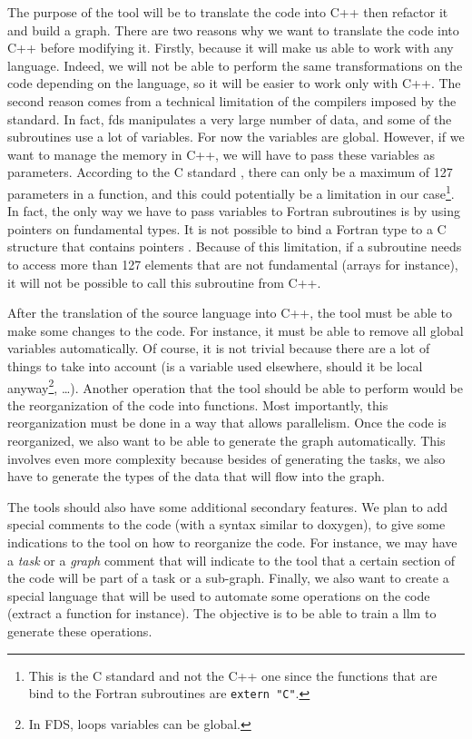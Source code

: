 The purpose of the tool will be to translate the code into C++ then refactor it
and build a graph. There are two reasons why we want to translate the code into
C++ before modifying it. Firstly, because it will make us able to work with any
language. Indeed, we will not be able to perform the same transformations on the
code depending on the language, so it will be easier to work only with C++. The
second reason comes from a technical limitation of the compilers imposed by the
standard. In fact, \gls{fds} manipulates a very large number of data, and some
of the subroutines use a lot of variables. For now the variables are global.
However, if we want to manage the memory in C++, we will have to pass these
variables as parameters. According to the C standard \cite{cstd}, there can only
be a maximum of 127 parameters in a function, and this could potentially be a
limitation in our case\footnote{This is the C standard and not the C++ one since
the functions that are bind to the Fortran subroutines are \texttt{extern
"C"}.}. In fact, the only way we have to pass variables to Fortran subroutines
is by using pointers on fundamental types. It is not possible to bind a Fortran
type to a C structure that contains pointers \cite{fortranbindstruct}. Because
of this limitation, if a subroutine needs to access more than 127 elements that
are not fundamental (arrays for instance), it will not be possible to call this
subroutine from C++.

After the translation of the source language into C++, the tool must be able to
make some changes to the code. For instance, it must be able to remove all
global variables automatically. Of course, it is not trivial because there are a
lot of things to take into account (is a variable used elsewhere, should it be
local anyway\footnote{In FDS, loops variables can be global.}, \dots). Another
operation that the tool should be able to perform would be the reorganization of
the code into functions. Most importantly, this reorganization must be done in a
way that allows parallelism. Once the code is reorganized, we also want to be
able to generate the graph automatically. This involves even more complexity
because besides of generating the tasks, we also have to generate the types of
the data that will flow into the graph.

The tools should also have some additional secondary features. We plan to add
special comments to the code (with a syntax similar to doxygen), to give some
indications to the tool on how to reorganize the code. For instance, we may have
a \textit{task} or a \textit{graph} comment that will indicate to the tool that
a certain section of the code will be part of a task or a sub-graph. Finally,
we also want to create a special language that will be used to automate some
operations on the code (extract a function for instance). The objective is to be
able to train a \gls{llm} to generate these operations.

